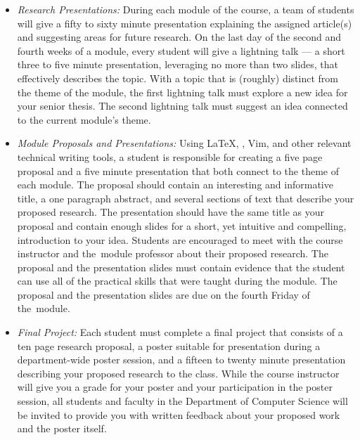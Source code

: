 \begin{itemize}
\item {\em Research Presentations:} During each module of the course, a team of students will give a fifty to sixty
  minute presentation explaining the assigned article(s) and suggesting areas for future research. On the last day of
  the second and fourth weeks of a module, every student will give a lightning talk --- a short three to five minute
  presentation, leveraging no more than two slides, that effectively describes the topic. With a topic that is (roughly)
  distinct from the theme of the module, the first lightning talk must explore a new idea for your senior thesis. The
  second lightning talk must suggest an idea connected to the current module's theme.


\item {\em Module Proposals and Presentations:} Using \LaTeX, \BibTeX, Vim, and other relevant technical writing tools,
  a student is responsible for creating a five page proposal and a five minute presentation that both connect to the
  theme of each module. The proposal should contain an interesting and informative title, a one paragraph abstract, and
  several sections of text that describe your proposed research. The presentation should have the same title as your
  proposal and contain enough slides for a short, yet intuitive and compelling, introduction to your idea.  Students are
  encouraged to meet with the course instructor and \mbox{the module} professor about their proposed research.  The
  proposal and the presentation slides must contain evidence that the student can use all of the practical skills that
  were taught during the module.  The proposal and the presentation slides are due on the fourth Friday of \mbox{the
    module}.



\item {\em Final Project:} Each student must complete a final project that consists of a ten page research proposal, a
  poster suitable for presentation during a department-wide poster session, and a fifteen to twenty minute presentation
  describing your proposed research to the class. While the course instructor will give you a grade for your poster and
  your participation in the poster session, all students and faculty in the Department of Computer Science will be
  invited to provide you with written feedback about your proposed work and the poster itself.

\end{itemize}

